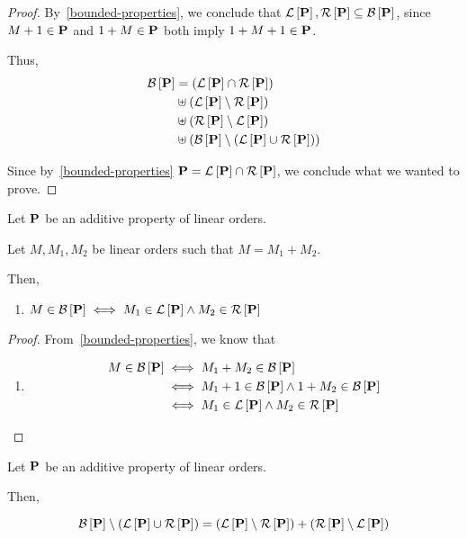 \begin{proof}
  By~\cref{bounded-properties}, we conclude that
  $\lb{\pp}, \rb{\pp} \subseteq \bounded{\pp}$,
  since $M + 1 \in \pp$ and $1 + M \in \pp$ both imply $1 + M + 1 \in \pp$.

  Thus,
  \begin{align*}
    \bounded{\pp} & = \ps{\lb{\pp} \cap \rb{\pp}}                                    \\
                  & \uplus \ps{\lb{\pp} \setminus \rb{\pp}}                          \\
                  & \uplus \ps{\rb{\pp} \setminus \lb{\pp}}                          \\
                  & \uplus \ps{ \bounded{\pp} \setminus \ps{\lb{\pp} \cup \rb{\pp}}}
  \end{align*}

  Since by~\cref{bounded-properties} $\pp = \lb{\pp} \cap \rb{\pp}$,
  we conclude what we wanted to prove.
\end{proof}

\begin{lemma}
  Let $\pp$ be an additive property of linear orders.

  Let $M, M_1, M_2$ be linear orders such that
  $M = M_1 + M_2$.

  Then,
  \begin{enumerate}
    \item
    $M \in \bounded{\pp} \iff M_1 \in \lb{\pp} \wedge M_2 \in \rb{\pp}$
  \end{enumerate}
\end{lemma}

\begin{proof}
  From~\cref{bounded-properties}, we know that
  \begin{enumerate}
    \item 
  \begin{align*}
    M \in \bounded{\pp}
     & \iff M_1 + M_2 \in \bounded{\pp}                                \\
     & \iff M_1 + 1 \in \bounded{\pp} \wedge 1 + M_2 \in \bounded{\pp} \\
     & \iff M_1 \in \lb{\pp} \wedge M_2 \in \rb{\pp}
  \end{align*}
  \end{enumerate}

\end{proof}

\begin{corollary}\label{bounded-is-right-plus-left}
  Let $\pp$ be an additive property of linear orders.

  Then,

  \[
    \bounded{\pp} \setminus \ps{\lb{\pp} \cup \rb{\pp}}
    = \ps{\lb{\pp} \setminus \rb{\pp}} + \ps{\rb{\pp} \setminus \lb{\pp}}
  \]
\end{corollary}

